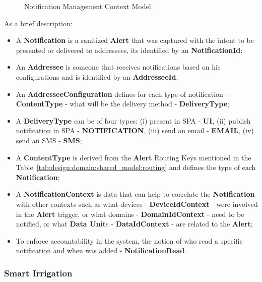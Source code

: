 \begin{figure}[H]
   \centering
  \resizebox{\columnwidth}{!}
  {
     
  }
  \caption[Notification Management Context Model]{Notification Management Context Model}
  \label{fig:design:domain:bounded_contexts:notification:diagram}
\end{figure}
 
As a brief description:

\begin{itemize}
   \item A \textbf{Notification} is a sanitized \textbf{Alert} that was captured with the intent to be presented or delivered to addressees, its identified by an \textbf{NotificationId};
   \item An \textbf{Addressee} is someone that receives notifications based on his configurations and is identified by an \textbf{AddresseeId};
   \item An \textbf{AddresseeConfiguration} defines for each type of notification - \textbf{ContentType} - what will be the delivery method - \textbf{DeliveryType};
   \item A \textbf{DeliveryType} can be of four types: (i) present in SPA - \textbf{UI}, (ii) publish notification in SPA - \textbf{NOTIFICATION}, (iii) send an email - \textbf{EMAIL}, (iv) send an SMS - \textbf{SMS}; 
   \item A \textbf{ContentType} is derived from the \textbf{Alert} Routing Keys mentioned in the Table~\ref{tab:design:domain:shared_model:routing} and defines the type of each \textbf{Notification};
   \item A \textbf{NotificationContext} is data that can help to correlate the \textbf{Notification} with other contexts such as what devices - \textbf{DeviceIdContext} - were involved in the \textbf{Alert} trigger, or what domains - \textbf{DomainIdContext} - need to be notified, or what \textbf{Data Unit}s - \textbf{DataIdContext} - are related to the \textbf{Alert};
   \item To enforce accountability in the system, the notion of who read a specific notification and when was added - \textbf{NotificationRead}.
\end{itemize}

\subsubsection*{Smart Irrigation}
\label{subsubsec:design:domain:bounded_contexts:irrigation}

